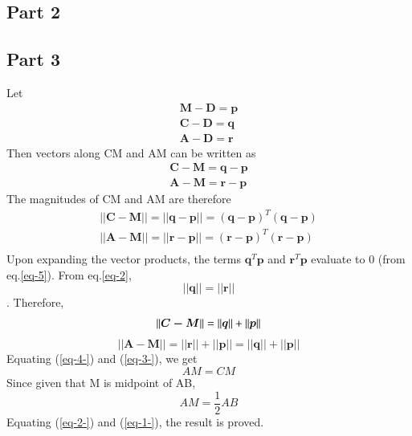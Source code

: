 \documentclass[journal,10pt,twocolumn]{article}
\begin{document}
\subsection*{Part 2}
\subsection*{Part 3}
Let
\begin{eqnarray}
	\boldsymbol{M-D} = \boldsymbol{p}\\
	\boldsymbol{C-D} = \boldsymbol{q}\\
	\boldsymbol{A-D} = \boldsymbol{r}
\end{eqnarray}
Then vectors along CM and AM can be written as
\begin{eqnarray}
	\boldsymbol{C-M} = \boldsymbol{q-p}\\
	\boldsymbol{A-M} = \boldsymbol{r-p}
\end{eqnarray}
The magnitudes of CM and AM are therefore
\begin{eqnarray}
	||\boldsymbol{C-M}|| = ||\boldsymbol{q-p}|| = (\boldsymbol{q-p})^T(\boldsymbol{q-p})\\
	||\boldsymbol{A-M}|| = ||\boldsymbol{r-p}|| = (\boldsymbol{r-p})^T(\boldsymbol{r-p})\\
\end{eqnarray}
Upon expanding the vector products, the terms $\boldsymbol{q}^T\boldsymbol{p}$ and $\boldsymbol{r}^T\boldsymbol{p}$ evaluate to 0 (from eq.\ref{eq-5}). From eq.\ref{eq-2}, $$||\boldsymbol{q}|| = ||\boldsymbol{r}||$$. Therefore,
\begin{equation}
||\boldsymbol{C-M}|| = ||\boldsymbol{q}|| + ||\boldsymbol{p}||\\
\label{eq-4-}
\end{equation}
\begin{equation}
||\boldsymbol{A-M}|| = ||\boldsymbol{r}|| + ||\boldsymbol{p}|| = ||\boldsymbol{q}|| + ||\boldsymbol{p}||
\label{eq-3-}
\end{equation}
Equating (\ref{eq-4-}) and (\ref{eq-3-}), we get
\begin{equation}
AM = CM
\label{eq-2-}
\end{equation}
Since given that M is midpoint of AB, 
\begin{equation}
AM = \frac{1}{2}AB
\label{eq-1-}
\end{equation}
Equating (\ref{eq-2-}) and (\ref{eq-1-}), the result is proved.
\end{document}
